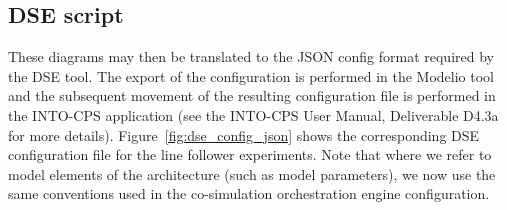 \subsection{DSE script}


These diagrams may then be translated to the JSON config format required by the DSE tool.  The export of the configuration is performed in the Modelio tool and the subsequent movement of the resulting configuration file is performed in the INTO-CPS application (see the INTO-CPS User Manual, Deliverable D4.3a~\cite{INTOCPSD4.3a} for more details).  %
Figure~\ref{fig:dse_config_json} shows the corresponding DSE configuration file for the line follower experiments. Note that where we refer to model elements of the architecture (such as model parameters), we now use the same conventions used in the co-simulation orchestration engine configuration.

